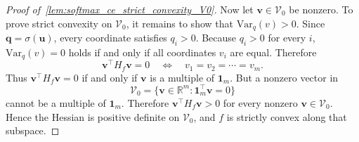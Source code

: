 \documentclass[10pt,a4paper]{amsart}
\begin{document}
\begin{proof}[Proof of~\cref{lem:softmax_ce_strict_convexity_V0}]
Now let \(\boldsymbol{v}\in \mathcal V_0\) be nonzero. To prove strict convexity on \(\mathcal V_0\), it remains to show that \(\mathrm{Var}_q(v) > 0\). Since \(\boldsymbol{q} = \sigma(\boldsymbol{u})\), every coordinate satisfies \(q_i > 0\). Because \(q_i>0\) for every \(i\), \(\mathrm{Var}_q(v)=0\) holds if and only if all coordinates \(v_i\) are equal. Therefore
\[ \boldsymbol{v}^\top H_f \boldsymbol{v} = 0 \quad \iff \quad v_1 = v_2 = \cdots = v_m. \]
Thus \(\boldsymbol{v}^\top H_f \boldsymbol{v} = 0\) if and only if \(\boldsymbol{v}\) is a multiple of \(\boldsymbol{1}_m\). But a nonzero vector in
\[
\mathcal V_0 = \{\boldsymbol{v} \in \mathbb{R}^m : \boldsymbol{1}_m^\top \boldsymbol{v} = 0\}
\]
cannot be a multiple of \(\boldsymbol{1}_m\). Therefore \(\boldsymbol{v}^\top H_f \boldsymbol{v} > 0\) for every nonzero \(\boldsymbol{v} \in \mathcal V_0\). Hence the Hessian is positive definite on \(\mathcal V_0\), and \(f\) is strictly convex along that subspace.
\end{proof}
\end{document}
